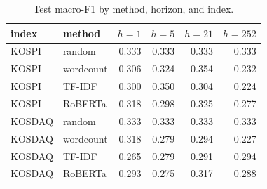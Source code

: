 \begin{table}[t]\centering
\caption{Test macro-F1 by method, horizon, and index.}
\begin{tabular}{llrrrr}
\toprule
index & method & $h{=}1$ & $h{=}5$ & $h{=}21$ & $h{=}252$ \\
\midrule
KOSPI & random & 0.333 & 0.333 & 0.333 & 0.333 \\
KOSPI & wordcount & 0.306 & 0.324 & 0.354 & 0.232 \\
KOSPI & TF-IDF & 0.300 & 0.350 & 0.304 & 0.224 \\
KOSPI & RoBERTa & 0.318 & 0.298 & 0.325 & 0.277 \\
\midrule
KOSDAQ & random & 0.333 & 0.333 & 0.333 & 0.333 \\
KOSDAQ & wordcount & 0.318 & 0.279 & 0.294 & 0.227 \\
KOSDAQ & TF-IDF & 0.265 & 0.279 & 0.291 & 0.294 \\
KOSDAQ & RoBERTa & 0.293 & 0.275 & 0.317 & 0.288 \\
\bottomrule
\end{tabular}
\end{table}